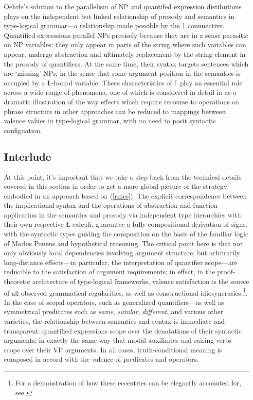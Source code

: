 \documentclass[output=paper,colorlinks,citecolor=brown]{langscibook}
\begin{document}
Oehrle's solution to the parallelism of NP and quantifed expression
distibutions plays on the independent but linked relationship of
prosody and semantics in type-logical grammar—a relationship made
possible by the \ensuremath{\vs} connnective. Quantified expressions parallel NPs
precisely because they are in a sense parasitic on NP variables: they
only appear in parts of the string where such variables can appear,
undergo abstraction and ultimately replacement by the string element
in the prosody of quantifiers. At the same time, their syntax targets
sentences which are `missing' NPs, in the sense that some argument
position in the semantics is occupied by a \L-bound variable. These
characteristics of \ensuremath{\vs} play an essential role across a wide range of
phenomena, one of which is considered in detail in  as
a dramatic illustration of the way effects which require recourse to
operations on phrase structure in other approaches can be reduced to
mappings between valence values in type-logical grammar, with no need
to posit syntactic configuation. 


\subsection{Interlude}

At this point, it's important that we take a step back from the
technical details covered in this section in order to get a more
global picture of the strategy embodied in an approach based on
(\ref{rules}). The explicit correspondence between the implicational syntax
and the operations of abstraction and function application in the
semantics and prosody via independent type hierarchies with their own
respective \L-calculi, guarantee a fully compositional derivation of
signs, with the syntactic types guiding the composition on the basis
of the familiar logic of Modus Ponens and hypothetical reasoning. The
critical point here is that not only obviously local dependencies
involving argument structure, but arbitrarily long-distance
effects---in particular, the interpretation of quantifier scope---are
reducible to the satisfaction of argument requirements; in effect, in
the proof-theoretic architecture of type-logical frameworks, valence
satisfaction is the source of all observed grammatical regularities,
as well as constructional idiosyncrasies.\footnote{For
a demonstration of how these eccentries can be elegantly accounted
for, see \citet{kubota-levine2022a}}. In the case of scopal operators, such
as generalized quantifiers---as well as symmetrical predicates such as
\textit{same}, \textit{similar}, \textit{different}, and various other varieties, the
relationship between semantics and syntax is immediate and
transparent: quantified expressions scope over the denotations of
their syntactic arguments, in exactly the same way that modal
auxiliaries and raising verbs scope over their VP arguments. In all
cases, truth-conditional meaning is composed in accord with the
valence of predicates and operators.
\end{document}
